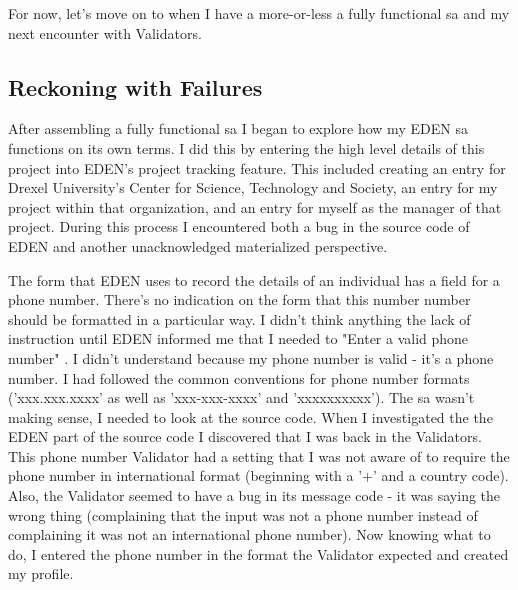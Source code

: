 \documentclass[a4paper,man,natbib,floatsintext]{apa6}
\begin{document}
  For now, let's move on to when I have a more-or-less a fully functional \gls{sa} and my next encounter with Validators.
  \newpage


   \subsection{Reckoning with Failures}
   After assembling a fully functional \gls{sa} I began to explore how my \gls{EDEN} \gls{sa} functions on its own terms. I did this by entering the high level details of this project into \gls{EDEN}'s project tracking feature. This included creating an entry for Drexel University's Center for Science, Technology and Society, an entry for my project within that organization, and an entry for myself as the manager of that project. During this process I encountered both a bug in the source code of \gls{EDEN} and another unacknowledged materialized perspective. 

   The form that \gls{EDEN} uses to record the details of an individual has a field for a phone number. There's no indication on the form that this number number should be formatted in a particular way. I didn't think anything the lack of instruction until \gls{EDEN} informed me that I needed to "Enter a valid phone number" \citep{Konig2020-yx}. I didn't understand because my phone number is valid - it's a phone number. I had followed the common conventions for phone number formats ('xxx.xxx.xxxx' as well as 'xxx-xxx-xxxx' and 'xxxxxxxxxx'). The \gls{sa} wasn't making sense, I needed to look at the source code. When I investigated the the \gls{EDEN} part of the source code I discovered that I was back in the Validators. This phone number Validator had a setting that I was not aware of to require the phone number in international format (beginning with a '+' and a country code). Also, the Validator seemed to have a bug in its message code - it was saying the wrong thing (complaining that the input was not a phone number instead of complaining it was not an international phone number). Now knowing what to do, I entered the phone number in the format the Validator expected and created my profile.
\end{document}
